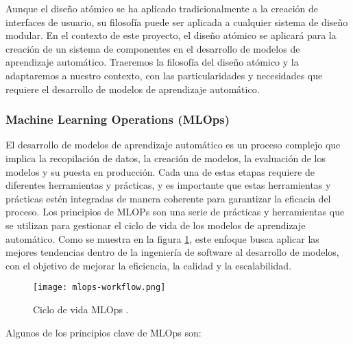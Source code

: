 Aunque el diseño atómico se ha aplicado tradicionalmente a la creación de interfaces
de usuario, su filosofía puede ser aplicada a cualquier sistema de diseño modular.
En el contexto de este proyecto, el diseño atómico se aplicará para la creación de un
sistema de componentes en el desarrollo de modelos de aprendizaje automático.
Traeremos la filosofía del diseño atómico y la adaptaremos a nuestro contexto,
con las particularidades y necesidades que requiere el desarrollo de modelos de
aprendizaje automático. 

\subsubsection{Machine Learning Operations (MLOps)}
El desarrollo de modelos de aprendizaje automático es un proceso complejo que implica
la recopilación de datos, la creación de modelos, la evaluación de los modelos y su
puesta en producción. Cada una de estas etapas requiere de diferentes herramientas y
prácticas, y es importante que estas herramientas y prácticas estén integradas de manera
coherente para garantizar la eficacia del proceso. Los principios de MLOPs son una serie de prácticas y herramientas que se utilizan
para gestionar el ciclo de vida de los modelos de aprendizaje automático. Como se muestra en la
figura \ref{fig:mlops-workflow}, este enfoque busca aplicar las mejores tendencias dentro de la 
ingeniería de software al desarrollo de modelos, con el objetivo de mejorar la eficiencia, la 
calidad y la escalabilidad.\medskip

\begin{figure}[ht]
    \centering
    \texttt{[image: mlops-workflow.png]}
    \caption{Ciclo de vida MLOps \cite{Merritt_2020}.}\label{fig:mlops-workflow}
\end{figure}


Algunos de los principios clave de MLOps son:

